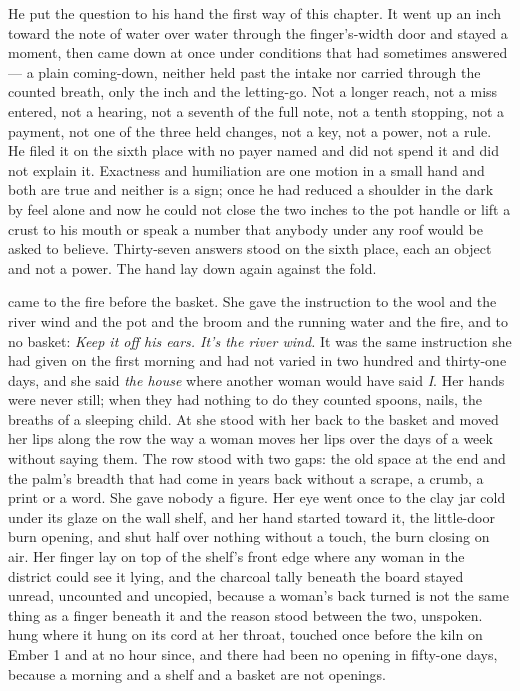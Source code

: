 He put the question to his hand the first way of this chapter. It went up an inch toward the note of water over water through the finger's-width door and stayed a moment, then came down at once under conditions that had sometimes answered --- a plain coming-down, neither held past the intake nor carried through the counted breath, only the inch and the letting-go. Not a longer reach, not a miss entered, not a hearing, not a seventh of the full note, not a tenth stopping, not a payment, not one of the three held changes, not a key, not a power, not a rule. He filed it on the sixth place with no payer named and did not spend it and did not explain it. Exactness and humiliation are one motion in a small hand and both are true and neither is a sign; once he had reduced a shoulder in the dark by feel alone and now he could not close the two inches to the pot handle or lift a crust to his mouth or speak a number that anybody under any roof would be asked to believe. Thirty-seven answers stood on the sixth place, each an object and not a power. The hand lay down again against the fold.

 came to the fire before the basket. She gave the instruction to the wool and the river wind and the pot and the broom and the running water and the fire, and to no basket: \emph{Keep it off his ears. It's the river wind.} It was the same instruction she had given on the first morning and had not varied in two hundred and thirty-one days, and she said \emph{the house} where another woman would have said \emph{I}. Her hands were never still; when they had nothing to do they counted spoons, nails, the breaths of a sleeping child. At  she stood with her back to the basket and moved her lips along the row the way a woman moves her lips over the days of a week without saying them. The row stood with two gaps: the old space at the end and the palm's breadth that had come in years back without a scrape, a crumb, a print or a word. She gave nobody a figure. Her eye went once to the clay jar cold under its glaze on the wall shelf, and her hand started toward it, the little-door burn opening, and shut half over nothing without a touch, the burn closing on air. Her finger lay on top of the shelf's front edge where any woman in the district could see it lying, and the charcoal tally beneath the board stayed unread, uncounted and uncopied, because a woman's back turned is not the same thing as a finger beneath it and the reason stood between the two, unspoken.  hung where it hung on its cord at her throat, touched once before the kiln on Ember 1 and at no hour since, and there had been no opening in fifty-one days, because a morning and a shelf and a basket are not openings.

